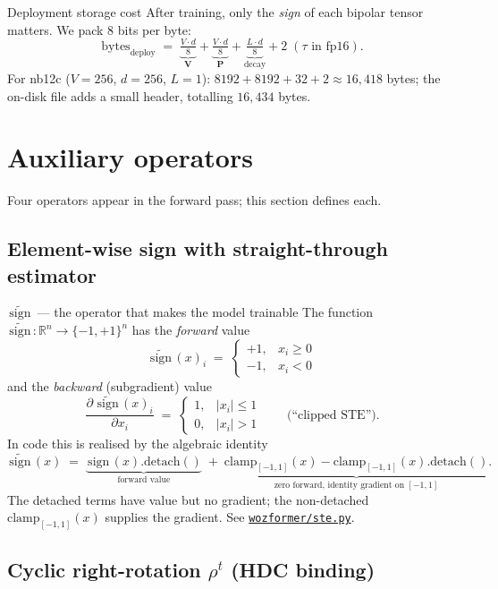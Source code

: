 \documentclass[11pt,a4paper]{article}
\newcommand{\bV}{\mathbf{V}}
\newcommand{\bP}{\mathbf{P}}
\newcommand{\bipset}{\{-1,+1\}}
\newcommand{\sg}{\,\text{sign}\,}
\newcommand{\stesign}{\,\widetilde{\text{sign}}\,}
\begin{document}
\begin{notation}{Deployment storage cost}
After training, only the \emph{sign} of each bipolar tensor matters. We pack
8 bits per byte:
\[
\text{bytes}_{\text{deploy}} \;=\; \underbrace{\tfrac{V\cdot d}{8}}_{\bV}
                           + \underbrace{\tfrac{V\cdot d}{8}}_{\bP}
                           + \underbrace{\tfrac{L\cdot d}{8}}_{\text{decay}}
                           + 2\;(\tau\text{ in fp16}).
\]
For nb12c ($V{=}256$, $d{=}256$, $L{=}1$): $8192 + 8192 + 32 + 2 \approx 16{,}418$ bytes;
the on-disk file adds a small header, totalling $16{,}434$ bytes.
\end{notation}

\section{Auxiliary operators}

Four operators appear in the forward pass; this section defines each.

\subsection{Element-wise sign with straight-through estimator}

\begin{notation}{$\stesign$ --- the operator that makes the model trainable}
The function $\stesign: \mathbb{R}^{n} \to \bipset^{n}$ has the
\emph{forward} value
\[
\stesign(x)_i \;=\; \begin{cases}
+1, & x_i \ge 0 \\
-1, & x_i < 0
\end{cases}
\]
and the \emph{backward} (subgradient) value
\[
\frac{\partial\,\stesign(x)_i}{\partial x_i} \;=\;
\begin{cases}
1, & |x_i| \le 1 \\
0, & |x_i| > 1
\end{cases}
\qquad\text{(``clipped STE'')}.
\]
In code this is realised by the algebraic identity
\[
\stesign(x) \;=\;
\underbrace{\sg(x).\text{detach}()}_{\text{forward value}} \;+\;
\underbrace{\text{clamp}_{[-1,1]}(x) - \text{clamp}_{[-1,1]}(x).\text{detach}()}_{\text{zero forward, identity gradient on }[-1,1]}.
\]
The detached terms have value but no gradient; the non-detached
$\text{clamp}_{[-1,1]}(x)$ supplies the gradient. See
\href{run:../../wozformer/ste.py}{\texttt{wozformer/ste.py}}.
\end{notation}

\subsection{Cyclic right-rotation $\rho^{t}$ (HDC binding)}
\end{document}

